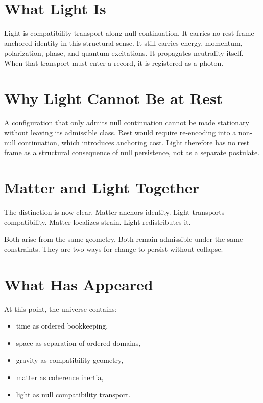 \documentclass[11pt,twoside,openright]{book}
\begin{document}
\section*{What Light Is}

Light is compatibility transport along null continuation. It carries no rest-frame anchored identity in this structural sense. It still carries energy, momentum, polarization, phase, and quantum excitations. It propagates neutrality itself. When that transport must enter a record, it is registered as a photon.

\section*{Why Light Cannot Be at Rest}

A configuration that only admits null continuation cannot be made stationary without leaving its admissible class. Rest would require re-encoding into a non-null continuation, which introduces anchoring cost. Light therefore has no rest frame as a structural consequence of null persistence, not as a separate postulate.

\section*{Matter and Light Together}

The distinction is now clear. Matter anchors identity. Light transports compatibility. Matter localizes strain. Light redistributes it.

Both arise from the same geometry. Both remain admissible under the same constraints. They are two ways for change to persist without collapse.

\section*{What Has Appeared}

At this point, the universe contains:

\begin{itemize}
\item time as ordered bookkeeping,
\item space as separation of ordered domains,
\item gravity as compatibility geometry,
\item matter as coherence inertia,
\item light as null compatibility transport.
\end{itemize}
\end{document}

